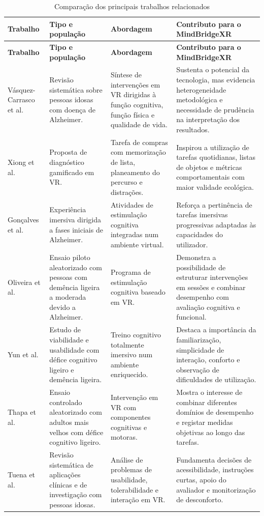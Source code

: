 \documentclass[12pt,a4paper,oneside]{report}
\begin{document}
\begin{longtable}{p{2.2cm}p{2.8cm}p{3.2cm}p{3.7cm}}
\caption{Comparação dos principais trabalhos relacionados}
\label{tab:estado-arte-comparacao}\\
\toprule
\textbf{Trabalho} & \textbf{Tipo e população} & \textbf{Abordagem} & \textbf{Contributo para o MindBridgeXR} \\
\midrule
\endfirsthead
\toprule
\textbf{Trabalho} & \textbf{Tipo e população} & \textbf{Abordagem} & \textbf{Contributo para o MindBridgeXR} \\
\midrule
\endhead
Vásquez-Carrasco et al.\ \cite{vasquez2025} &
Revisão sistemática sobre pessoas idosas com doença de Alzheimer. &
Síntese de intervenções em \ac{VR} dirigidas à função cognitiva, função física e qualidade de vida. &
Sustenta o potencial da tecnologia, mas evidencia heterogeneidade metodológica e necessidade de prudência na interpretação dos resultados. \\

Xiong et al.\ \cite{xiong2024} &
Proposta de diagnóstico gamificado em \ac{VR}. &
Tarefa de compras com memorização de lista, planeamento do percurso e distrações. &
Inspirou a utilização de tarefas quotidianas, listas de objetos e métricas comportamentais com maior validade ecológica. \\

Gonçalves et al.\ \cite{goncalves2025} &
Experiência imersiva dirigida a fases iniciais de Alzheimer. &
Atividades de estimulação cognitiva integradas num ambiente virtual. &
Reforça a pertinência de tarefas imersivas progressivas adaptadas às capacidades do utilizador. \\

Oliveira et al.\ \cite{oliveira2021} &
Ensaio piloto aleatorizado com pessoas com demência ligeira a moderada devido a Alzheimer. &
Programa de estimulação cognitiva baseado em \ac{VR}. &
Demonstra a possibilidade de estruturar intervenções em sessões e combinar desempenho com avaliação cognitiva e funcional. \\

Yun et al.\ \cite{yun2020} &
Estudo de viabilidade e usabilidade com défice cognitivo ligeiro e demência ligeira. &
Treino cognitivo totalmente imersivo num ambiente enriquecido. &
Destaca a importância da familiarização, simplicidade de interação, conforto e observação de dificuldades de utilização. \\

Thapa et al.\ \cite{thapa2020} &
Ensaio controlado aleatorizado com adultos mais velhos com défice cognitivo ligeiro. &
Intervenção em \ac{VR} com componentes cognitivas e motoras. &
Mostra o interesse de combinar diferentes domínios de desempenho e registar medidas objetivas ao longo das tarefas. \\

Tuena et al.\ \cite{tuena2020} &
Revisão sistemática de aplicações clínicas e de investigação com pessoas idosas. &
Análise de problemas de usabilidade, tolerabilidade e interação em \ac{VR}. &
Fundamenta decisões de acessibilidade, instruções curtas, apoio do avaliador e monitorização de desconforto. \\
\bottomrule
\end{longtable}
\end{document}
